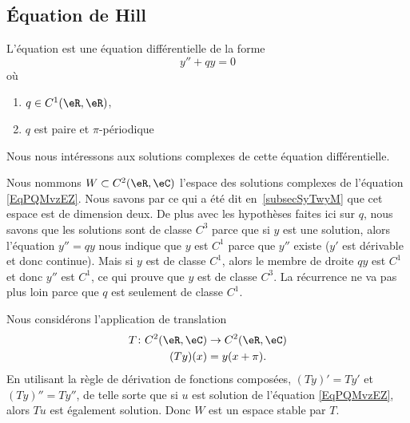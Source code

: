 \subsection{Équation de Hill}
\label{SubSecDWwVVPa}

L'équation  est une équation différentielle de la forme
\begin{equation}    \label{EqPQMvzEZ}
    y''+qy=0
\end{equation}
où
\begin{enumerate}
    \item
        \( q\in C^1(\eR,\eR)\),
    \item
        \( q\) est paire et \( \pi\)-périodique
\end{enumerate}
Nous nous intéressons aux solutions complexes de cette équation différentielle.

Nous nommons \( W\subset C^2(\eR,\eC)\) l'espace des solutions complexes de l'équation \eqref{EqPQMvzEZ}. Nous savons par ce qui a été dit en~\ref{subsecSyTwyM} que cet espace est de dimension deux. De plus avec les hypothèses faites ici sur \( q\), nous savons que les solutions sont de classe $C^3$ parce que si \( y\) est une solution, alors l'équation \( y''=qy\) nous indique que \( y\) est \( C^1\) parce que \( y''\) existe (\( y'\) est dérivable et donc continue). Mais si \( y\) est de classe \( C^1\), alors le membre de droite \( qy\) est \( C^1\) et donc \( y''\) est \( C^1\), ce qui prouve que \( y\) est de classe \( C^3\). La récurrence ne va pas plus loin parce que \( q\) est seulement de classe \( C^1\).

Nous considérons l'application de translation
\begin{equation}
    \begin{aligned}
        T\colon C^2(\eR,\eC)&\to C^2(\eR,\eC) \\
        (Ty)(x)&=y(x+\pi).
    \end{aligned}
\end{equation}
En utilisant la règle de dérivation de fonctions composées, \( (Ty)'=Ty'\) et \( (Ty)''=Ty''\), de telle sorte que si \( u\) est solution de l'équation \eqref{EqPQMvzEZ}, alors \( Tu\) est également solution. Donc \( W\) est un espace stable par \( T\).

